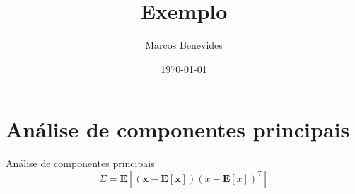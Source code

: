 \documentclass{beamer}
\title{Exemplo}
\date{\today}
\author{Marcos Benevides}
\institute{Universidade Federal do Maranhão}
\newcommand{\exptd}[1]{\mathbf{E}\left[#1\right]}
\newcommand{\vect}[1]{\boldsymbol{#1}}
\begin{document}
  \maketitle
  \section{Análise de componentes principais}

  \begin{frame}{Análise de componentes principais}
      \[ \Sigma = \exptd{(\vect{x} - \exptd{\vect{x}}) (x - \exptd{x})^T } \]
  \end{frame}
\end{document}
